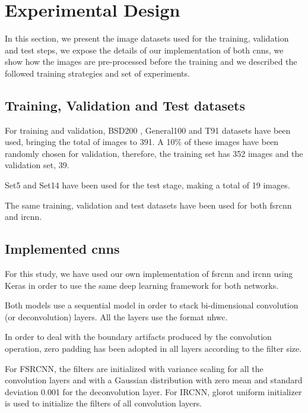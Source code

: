 \section{Experimental Design}\label{sec:experimental_design}

In this section, we present the image datasets used for the training, validation and test steps, we expose the details of our implementation of both \glspl{cnn}, we show how the images are pre-processed before the training and we described the followed training strategies and set of experiments.

\subsection{Training, Validation and Test datasets}

For training and validation, BSD200 \cite{BSDS}, General100 \cite{FSRCNN} and T91 \cite{T91} datasets have been used, bringing the total of images to 391. A 10\% of these images have been randomly chosen for validation, therefore, the training set has 352 images and the validation set, 39.

Set5 \cite{SET5} and Set14 \cite{SET14} have been used for the test stage, making a total of 19 images.

The same training, validation and test datasets have been used for both \gls{fsrcnn} and \gls{ircnn}. 

\subsection{Implemented \glspl{cnn}}
For this study, we have used our own implementation of \gls{fsrcnn} and \gls{ircnn} using Keras \cite{KERAS} in order to use the same deep learning framework for both networks.

Both models use a sequential model in order to stack bi-dimensional convolution (or deconvolution) layers. All the layers use the format \gls{nhwc}.

In order to deal with the boundary artifacts produced by the convolution operation, zero padding has been adopted in all layers according to the filter size.

For FSRCNN, the filters are initialized with variance scaling for all the convolution layers and with a Gaussian distribution with zero mean and standard deviation 0.001 for the deconvolution layer. For IRCNN, glorot uniform initializer \cite{XAVIER} is used to initialize the filters of all convolution layers.

